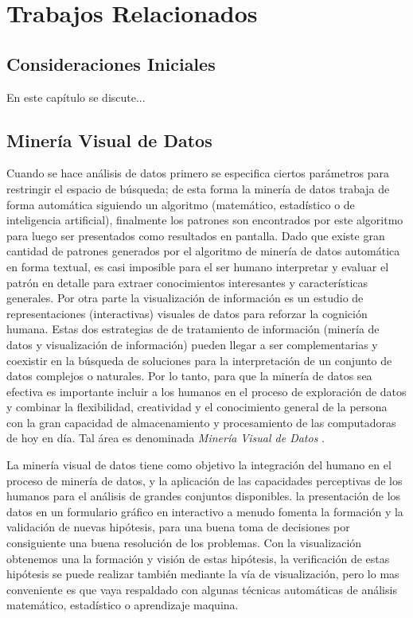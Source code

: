 \chapter{Trabajos Relacionados}
\section{Consideraciones Iniciales}
En este capítulo se discute... 
\section{Minería Visual de Datos}

Cuando se hace análisis de datos primero se especifica ciertos parámetros para restringir el espacio de búsqueda; de esta forma la minería de datos trabaja de forma automática siguiendo un algoritmo (matemático, estadístico o de inteligencia artificial), finalmente los patrones son encontrados por este algoritmo para luego ser presentados como resultados en pantalla. Dado que existe gran cantidad de patrones generados por el algoritmo de minería de datos automática en forma textual, es casi imposible para el ser humano interpretar y evaluar el patrón en detalle para extraer conocimientos interesantes y características generales. Por otra parte la visualización de información es un estudio de representaciones (interactivas) visuales de datos para reforzar la cognición humana. Estas dos estrategias de de tratamiento de información (minería de datos y visualización de información) pueden llegar a ser complementarias y coexistir en la búsqueda de soluciones para la interpretación de un conjunto de datos complejos o naturales. Por lo tanto, para que la minería de datos sea efectiva es importante incluir a los humanos en el proceso de exploración de datos y combinar la flexibilidad, creatividad y el conocimiento general de la persona con la gran capacidad de almacenamiento y procesamiento de las computadoras de hoy en día. Tal área es denominada \textit{Minería Visual de Datos} \cite{wong1999guest}.

La minería visual de datos tiene como objetivo la integración del humano en el proceso de minería de datos, y la aplicación de las capacidades perceptivas de los humanos para el análisis de grandes conjuntos disponibles. la presentación de los datos en un formulario gráfico en interactivo a menudo fomenta la formación y la validación de nuevas hipótesis, para una buena toma de decisiones por consiguiente una buena resolución de los problemas. Con la visualización obtenemos una la formación y visión de estas hipótesis, la verificación de estas hipótesis se puede realizar también mediante la vía de visualización, pero lo mas conveniente es que vaya respaldado con algunas técnicas automáticas de análisis matemático, estadístico o aprendizaje maquina. 


